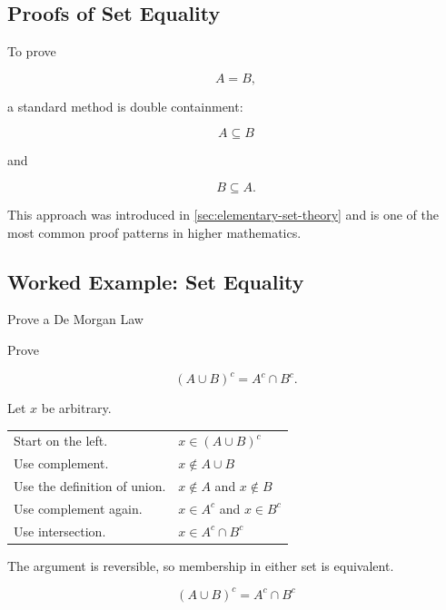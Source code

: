 \subsection{Proofs of Set Equality}
\label{subsec:proof-set-equality}

To prove

\[ A=B, \]

a standard method is double containment:

\[ A\subseteq B \]

and

\[ B\subseteq A. \]

This approach was introduced in \cref{sec:elementary-set-theory} and is one of
the most common proof patterns in higher mathematics.

\subsection{Worked Example: Set Equality}
\label{subsec:worked-set-equality-proof}

\begin{workedexamplebox}{Prove a De Morgan Law}

Prove

\[ (A\cup B)^c=A^c\cap B^c. \]

Let \(x\) be arbitrary.

\begin{tabularx}{\textwidth}{@{}>{\raggedright\arraybackslash}p{}X@{}}
Start on the left. & \(x\in(A\cup B)^c\)\\
Use complement. & \(x\notin A\cup B\)\\
Use the definition of union. & \(x\notin A\) and \(x\notin B\)\\
Use complement again. & \(x\in A^c\) and \(x\in B^c\)\\
Use intersection. & \(x\in A^c\cap B^c\)
\end{tabularx}

The argument is reversible, so membership in either set is equivalent.

\begin{answerbox}
\[ (A\cup B)^c=A^c\cap B^c \]
\end{answerbox}
\end{workedexamplebox}

